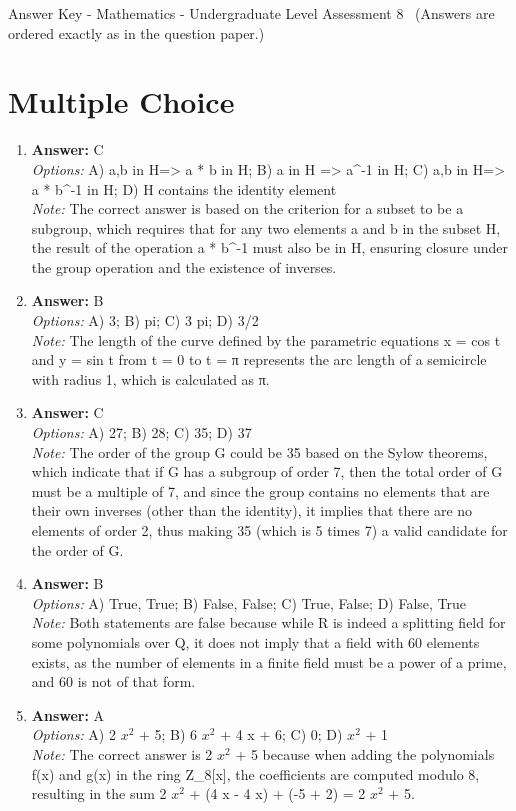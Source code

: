 \documentclass[12pt]{article}
\begin{document}
\begin{center}
Answer Key - Mathematics - Undergraduate Level Assessment 8 \
\small (Answers are ordered exactly as in the question paper.)
\end{center}

\section*{Multiple Choice}
\begin{enumerate}[label=\arabic*.]
\item \textbf{Answer:} C
\\ \textit{Options:} A) a,b in H=\textgreater{} a * b in H; B) a in H =\textgreater{} a^-1 in H; C) a,b in H=\textgreater{} a * b^-1 in H; D) H contains the identity element
\\ \textit{Note:} The correct answer is based on the criterion for a subset to be a subgroup, which requires that for any two elements a and b in the subset H, the result of the operation a * b^-1 must also be in H, ensuring closure under the group operation and the existence of inverses.
\item \textbf{Answer:} B
\\ \textit{Options:} A) 3; B) pi; C) 3 pi; D) 3/2
\\ \textit{Note:} The length of the curve defined by the parametric equations x = cos t and y = sin t from t = 0 to t = π represents the arc length of a semicircle with radius 1, which is calculated as π.
\item \textbf{Answer:} C
\\ \textit{Options:} A) 27; B) 28; C) 35; D) 37
\\ \textit{Note:} The order of the group G could be 35 based on the Sylow theorems, which indicate that if G has a subgroup of order 7, then the total order of G must be a multiple of 7, and since the group contains no elements that are their own inverses (other than the identity), it implies that there are no elements of order 2, thus making 35 (which is 5 times 7) a valid candidate for the order of G.
\item \textbf{Answer:} B
\\ \textit{Options:} A) True, True; B) False, False; C) True, False; D) False, True
\\ \textit{Note:} Both statements are false because while R is indeed a splitting field for some polynomials over Q, it does not imply that a field with 60 elements exists, as the number of elements in a finite field must be a power of a prime, and 60 is not of that form.
\item \textbf{Answer:} A
\\ \textit{Options:} A) 2 $x^2$ + 5; B) 6 $x^2$ + 4 x + 6; C) 0; D) $x^2$ + 1
\\ \textit{Note:} The correct answer is 2 $x^2$ + 5 because when adding the polynomials f(x) and g(x) in the ring Z\_8[x], the coefficients are computed modulo 8, resulting in the sum 2 $x^2$ + (4 x - 4 x) + (-5 + 2) = 2 $x^2$ + 5.
\end{enumerate}
\end{document}
